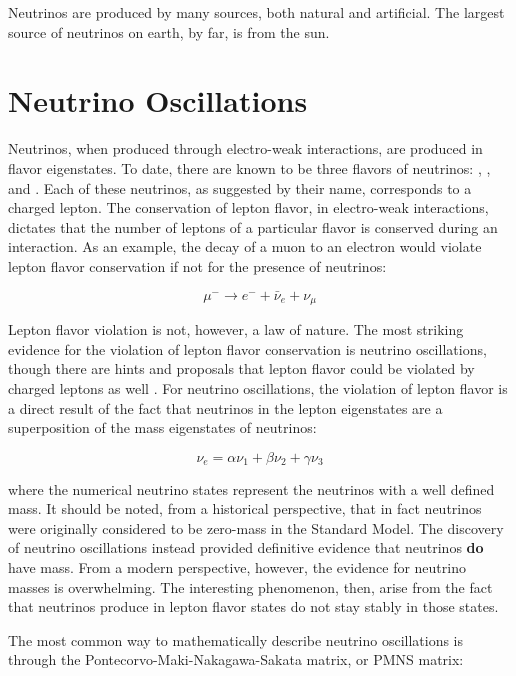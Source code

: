 Neutrinos are produced by many sources, both natural and artificial.  The largest source of neutrinos on earth, by far, is from the sun.

\section{Neutrino Oscillations}

Neutrinos, when produced through electro-weak interactions, are produced in flavor eigenstates.  To date, there are known to be three flavors of neutrinos: \nue, \numu, and \nutau.  Each of these neutrinos, as suggested by their name, corresponds to a charged lepton.  The conservation of lepton flavor, in electro-weak interactions, dictates that the number of leptons of a particular flavor is conserved during an interaction.  As an example, the decay of a muon to an electron would violate lepton flavor conservation if not for the presence of neutrinos:

\begin{equation}
\mu^- \rightarrow e^- + \bar{\nu}_e + \nu_\mu
\end{equation}

Lepton flavor violation is not, however, a law of nature.  The most striking evidence for the violation of lepton flavor conservation is neutrino oscillations, though there are hints and proposals that lepton flavor could be violated by charged leptons as well \cite{mu2e}.  For neutrino oscillations, the violation of lepton flavor is a direct result of the fact that neutrinos in the lepton eigenstates are a superposition of the mass eigenstates of neutrinos:

\begin{equation}
\nu_e = \alpha \nu_1 + \beta \nu_2 + \gamma \nu_3
\end{equation}

where the numerical neutrino states represent the neutrinos with a well defined mass.  It should be noted, from a historical perspective, that in fact neutrinos were originally considered to be zero-mass in the Standard Model.  The discovery of neutrino oscillations instead provided definitive evidence that neutrinos {\bf do} have mass.  From a modern perspective, however, the evidence for neutrino masses is overwhelming.  The interesting phenomenon, then, arise from the fact that neutrinos produce in lepton flavor states do not stay stably in those states.  

The most common way to mathematically describe neutrino oscillations is through the Pontecorvo-Maki-Nakagawa-Sakata matrix, or PMNS matrix:

